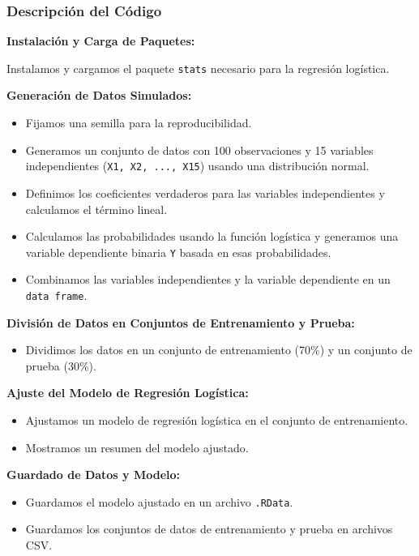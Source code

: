 \subsubsection*{Descripción del Código}

\textbf{Instalación y Carga de Paquetes:}

Instalamos y cargamos el paquete \texttt{stats} necesario para la regresión logística.

\textbf{Generación de Datos Simulados:}

\begin{itemize}
    \item Fijamos una semilla para la reproducibilidad.
    \item Generamos un conjunto de datos con 100 observaciones y 15 variables independientes (\texttt{X1, X2, ..., X15}) usando una distribución normal.
    \item Definimos los coeficientes verdaderos para las variables independientes y calculamos el término lineal.
    \item Calculamos las probabilidades usando la función logística y generamos una variable dependiente binaria \texttt{Y} basada en esas probabilidades.
    \item Combinamos las variables independientes y la variable dependiente en un \texttt{data frame}.
\end{itemize}

\textbf{División de Datos en Conjuntos de Entrenamiento y Prueba:}

\begin{itemize}
    \item Dividimos los datos en un conjunto de entrenamiento (70\%) y un conjunto de prueba (30\%).
\end{itemize}

\textbf{Ajuste del Modelo de Regresión Logística:}

\begin{itemize}
    \item Ajustamos un modelo de regresión logística en el conjunto de entrenamiento.
    \item Mostramos un resumen del modelo ajustado.
\end{itemize}

\textbf{Guardado de Datos y Modelo:}

\begin{itemize}
    \item Guardamos el modelo ajustado en un archivo \texttt{.RData}.
    \item Guardamos los conjuntos de datos de entrenamiento y prueba en archivos CSV.
\end{itemize}

